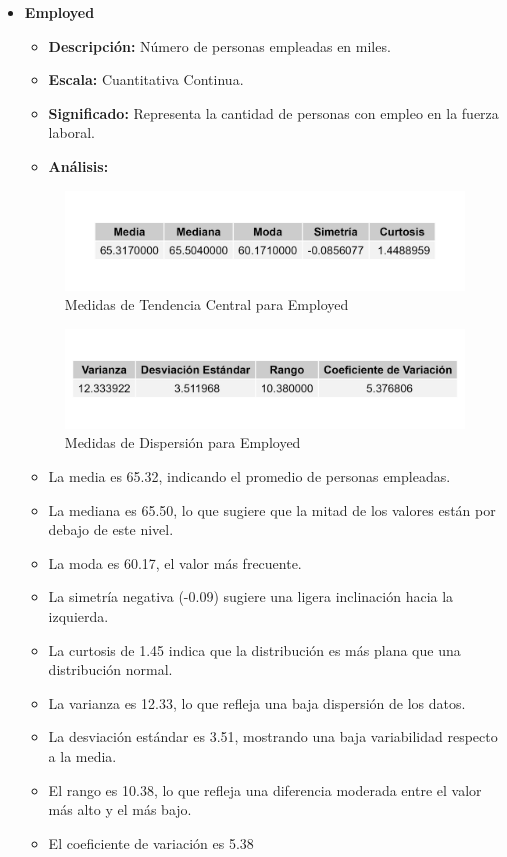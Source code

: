 \documentclass{article}
\begin{document}
\begin{itemize}
    \item \textbf{Employed}
    \begin{itemize}
        \item \textbf{Descripción:} Número de personas empleadas en miles.
        \item \textbf{Escala:} Cuantitativa Continua.
        \item \textbf{Significado:} Representa la cantidad de personas con empleo en la fuerza laboral.
        \item \textbf{Análisis:} 
    \end{itemize}
    \begin{figure}[H]
        \centering
        \includegraphics[width=\textwidth]{MTC/Employed_central.png}
        \caption{Medidas de Tendencia Central para Employed}
    \end{figure}
    \begin{figure}[H]
        \centering
        \includegraphics[width=\textwidth]{MTC/Employed_dispersion.png}
        \caption{Medidas de Dispersión para Employed}
    \end{figure}
            \begin{itemize}
                \item La media es 65.32, indicando el promedio de personas empleadas.
                \item La mediana es 65.50, lo que sugiere que la mitad de los valores están por debajo de este nivel.
                \item La moda es 60.17, el valor más frecuente.
                \item La simetría negativa (-0.09) sugiere una ligera inclinación hacia la izquierda.
                \item La curtosis de 1.45 indica que la distribución es más plana que una distribución normal.
                \item La varianza es 12.33, lo que refleja una baja dispersión de los datos.
                \item La desviación estándar es 3.51, mostrando una baja variabilidad respecto a la media.
                \item El rango es 10.38, lo que refleja una diferencia moderada entre el valor más alto y el más bajo.
                \item El coeficiente de variación es 5.38%
            \end{itemize}
\end{itemize}
\end{document}
